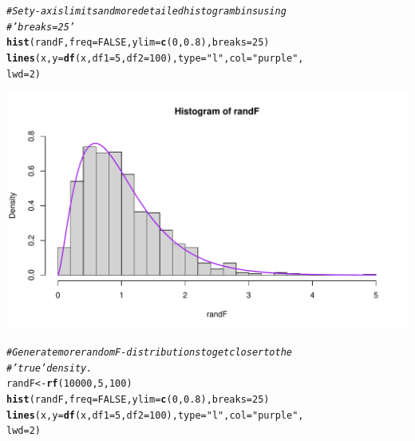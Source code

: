 \documentclass[oneside]{book}\usepackage[]{graphicx}\usepackage[dvipsnames,table,xcdraw]{xcolor}
\makeatletter
\def\maxwidth{ %
  \ifdim\Gin@nat@width>\linewidth
    \linewidth
  \else
    \Gin@nat@width
  \fi
}
\newcommand{\hlnum}[1]{\textcolor[rgb]{0.686,0.059,0.569}{#1}}%
\newcommand{\hlstr}[1]{\textcolor[rgb]{0.192,0.494,0.8}{#1}}%
\newcommand{\hlcom}[1]{\textcolor[rgb]{0.678,0.584,0.686}{\textit{#1}}}%
\newcommand{\hlstd}[1]{\textcolor[rgb]{0.345,0.345,0.345}{#1}}%
\newcommand{\hlkwb}[1]{\textcolor[rgb]{0.69,0.353,0.396}{#1}}%
\newcommand{\hlkwc}[1]{\textcolor[rgb]{0.333,0.667,0.333}{#1}}%
\newcommand{\hlkwd}[1]{\textcolor[rgb]{0.737,0.353,0.396}{\textbf{#1}}}%
\newenvironment{kframe}{%
 \def\at@end@of@kframe{}%
 \ifinner\ifhmode%
  \def\at@end@of@kframe{\end{minipage}}%
  \begin{minipage}{\columnwidth}%
 \fi\fi%
 \def\FrameCommand##1{\hskip\@totalleftmargin \hskip-\fboxsep
 \colorbox{shadecolor}{##1}\hskip-\fboxsep
     \hskip-\linewidth \hskip-\@totalleftmargin \hskip\columnwidth}%
 \MakeFramed {\advance\hsize-\width
   \@totalleftmargin\z@ \linewidth\hsize
   \@setminipage}}%
 {\par\unskip\endMakeFramed%
 \at@end@of@kframe}
\newenvironment{knitrout}{}{} %
\makeatother
\begin{document}
\begin{knitrout}
{}


\begin{kframe}\begin{alltt}
\hlcom{# Set y-axis limits and more detailed histogram bins using}
\hlcom{# 'breaks = 25'}
\hlkwd{hist}\hlstd{(randF,} \hlkwc{freq} \hlstd{=} \hlnum{FALSE}\hlstd{,} \hlkwc{ylim} \hlstd{=} \hlkwd{c}\hlstd{(}\hlnum{0}\hlstd{,} \hlnum{0.8}\hlstd{),} \hlkwc{breaks} \hlstd{=} \hlnum{25}\hlstd{)}
\hlkwd{lines}\hlstd{(x,} \hlkwc{y} \hlstd{=} \hlkwd{df}\hlstd{(x,} \hlkwc{df1} \hlstd{=} \hlnum{5}\hlstd{,} \hlkwc{df2} \hlstd{=} \hlnum{100}\hlstd{),} \hlkwc{type} \hlstd{=} \hlstr{"l"}\hlstd{,} \hlkwc{col} \hlstd{=} \hlstr{"purple"}\hlstd{,}
  \hlkwc{lwd} \hlstd{=} \hlnum{2}\hlstd{)}
\end{alltt}
\end{kframe}

{\centering \includegraphics[width=\maxwidth]{figure/unnamed-chunk-35-3} 

}


\begin{kframe}\begin{alltt}
\hlcom{# Generate more random F-distributions to get closer to the}
\hlcom{# 'true' density.}
\hlstd{randF} \hlkwb{<-} \hlkwd{rf}\hlstd{(}\hlnum{10000}\hlstd{,} \hlnum{5}\hlstd{,} \hlnum{100}\hlstd{)}
\hlkwd{hist}\hlstd{(randF,} \hlkwc{freq} \hlstd{=} \hlnum{FALSE}\hlstd{,} \hlkwc{ylim} \hlstd{=} \hlkwd{c}\hlstd{(}\hlnum{0}\hlstd{,} \hlnum{0.8}\hlstd{),} \hlkwc{breaks} \hlstd{=} \hlnum{25}\hlstd{)}
\hlkwd{lines}\hlstd{(x,} \hlkwc{y} \hlstd{=} \hlkwd{df}\hlstd{(x,} \hlkwc{df1} \hlstd{=} \hlnum{5}\hlstd{,} \hlkwc{df2} \hlstd{=} \hlnum{100}\hlstd{),} \hlkwc{type} \hlstd{=} \hlstr{"l"}\hlstd{,} \hlkwc{col} \hlstd{=} \hlstr{"purple"}\hlstd{,}
  \hlkwc{lwd} \hlstd{=} \hlnum{2}\hlstd{)}
\end{alltt}
\end{kframe}


\end{knitrout}
\end{document}
